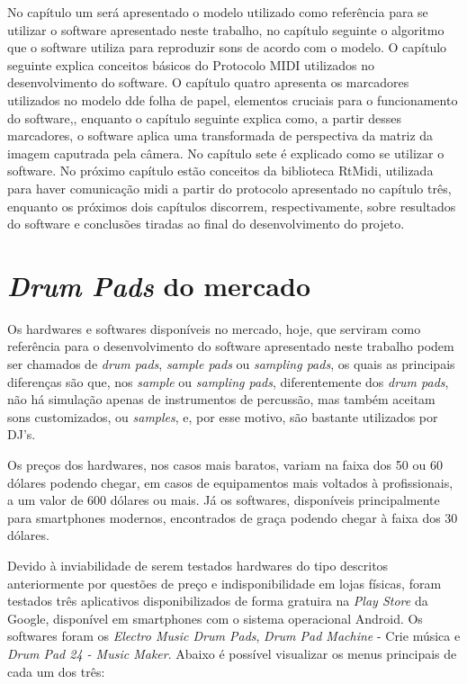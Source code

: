 \documentclass[12pt]{report}
\begin{document}
No capítulo um será apresentado o modelo utilizado como referência
para se utilizar o software apresentado neste trabalho, no capítulo
seguinte o algoritmo que o software utiliza para reproduzir sons de
acordo com o modelo. O capítulo seguinte explica conceitos básicos do
Protocolo MIDI utilizados no desenvolvimento do software. O capítulo
quatro apresenta os marcadores utilizados no modelo dde folha de
papel, elementos cruciais para o funcionamento do software,, enquanto
o capítulo seguinte explica como, a partir desses marcadores, o
software aplica uma transformada de perspectiva da matriz da imagem
caputrada pela câmera. No capítulo sete é explicado como se utilizar o
software. No próximo capítulo estão conceitos da biblioteca RtMidi,
utilizada para haver comunicação midi a partir do protocolo
apresentado no capítulo três, enquanto os próximos dois capítulos
discorrem, respectivamente, sobre resultados do software e conclusões
tiradas ao final do desenvolvimento do projeto.

\chapter{{\it Drum Pads} do mercado}
\label{cha:drum_pads}

Os hardwares e softwares disponíveis no mercado, hoje, que serviram como referência para o desenvolvimento do software apresentado neste trabalho podem ser chamados de {\it drum pads}, {\it sample pads} ou {\it sampling pads}, os quais as principais diferenças são que, nos {\it sample} ou {\it sampling pads}, diferentemente dos {\it drum pads}, não há simulação apenas de instrumentos de percussão, mas também aceitam sons customizados, ou {\it samples}, e, por esse motivo, são bastante utilizados por DJ's.

Os preços dos hardwares, nos casos mais baratos, variam na faixa dos 50 ou 60 dólares podendo chegar, em casos de equipamentos mais voltados à profissionais, a um valor de 600 dólares ou mais. Já os softwares, disponíveis principalmente para smartphones modernos, encontrados de graça podendo chegar à faixa dos 30 dólares.

Devido à inviabilidade de serem testados hardwares do tipo descritos anteriormente por questões de preço e indisponibilidade em lojas físicas, foram testados três aplicativos disponibilizados de forma gratuira na {\it Play Store} da Google, disponível em smartphones com o sistema operacional Android. Os softwares foram os {\it Electro Music Drum Pads}, {\it Drum Pad Machine} - Crie música e {\it Drum Pad 24 - Music Maker}. Abaixo é possível visualizar os menus principais de cada um dos três:
\end{document}
